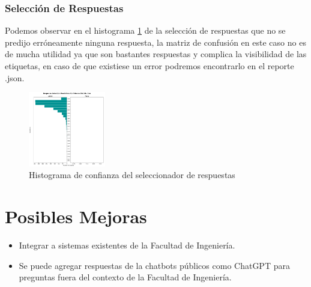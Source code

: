 \subsubsection{Selección de Respuestas}
Podemos observar en el histograma \ref{fig:response_histograma} de la selección de respuestas que
no se predijo erróneamente ninguna respuesta, la matriz de confusión en este caso no es de mucha
utilidad ya que son bastantes respuestas y complica la visibilidad de las etiquetas, en caso de que
existiese un error podremos encontrarlo en el reporte .json.

\begin{figure}[H]
	\centering
	\includegraphics[angle=0,width=0.3\textwidth]{Figuras/response_selection_histogram.png}
	\caption{Histograma de confianza del seleccionador de respuestas}
	\label{fig:response_histograma}
\end{figure}
\section{Posibles Mejoras}
\begin{itemize}
	\item Integrar a sistemas existentes de la Facultad de Ingeniería.
	\item Se puede agregar respuestas de la chatbots públicos como	ChatGPT \cite{api_chatgpt}
	      para preguntas
	      fuera del
	      contexto de la Facultad de Ingeniería.
\end{itemize}

